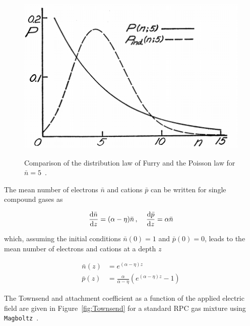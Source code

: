 \endgroup
\newpage
	
\begingroup\setlength{\intextsep}{0pt}\setlength{\columnsep}{15pt}
	
	\begin{figure}
		\centering
		\includegraphics[width = \linewidth]{fig/chapt3/Furry.png}\\
		\caption{\label{fig:furry} Comparison of the distribution law of Furry and the Poisson law for $\bar{n} = 5$~\cite{FURRY1937}.}
	\end{figure}
	
	The mean number of electrons $\bar{n}$ and cations $\bar{p}$ can be written for single compound gases as
	
	\begin{equation}
	\label{eq:townsend}
	\frac{\mathrm{d}\bar{n}}{\mathrm{d} z} = (\alpha - \eta)\bar{n} \, , \;\;\;\; \frac{\mathrm{d}\bar{p}}{\mathrm{d} z} = \alpha\bar{n}
	\end{equation}
	
	which, assuming the initial conditions $\bar{n}(0) = 1$ and $\bar{p}(0) = 0$, leads to the mean number of electrons and cations at a depth $z$
	
	\begin{equation}
	\label{eq:Townsend-avalanche}
		\begin{aligned}
			\bar{n}(z) &= e^{(\alpha - \eta)z}\\
			\bar{p}(z) &= \frac{\alpha}{\alpha - \eta}\left( e^{(\alpha - \eta)z} - 1\right)
		\end{aligned}
	\end{equation}
	
	The Townsend and attachment coefficient as a function of the applied electric field are given in Figure~\ref{fig:Townsend} for a standard RPC gas mixture using \texttt{Magboltz}~\cite{MAGBOLTZ}.
	
